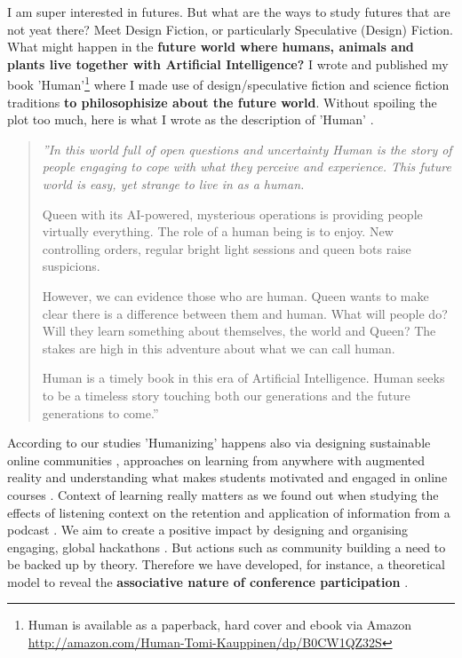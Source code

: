 \documentclass[11pt,letterpaper]{article}
\newenvironment{itquote}
{\begin{quote}\itshape}
{\end{quote}}
\begin{document}
I am super interested in futures. But what are the ways to study futures that are not yeat there? Meet Design Fiction, or particularly Speculative (Design) Fiction. What might happen in the \textbf{future world where humans, animals and plants live together with Artificial Intelligence?} I wrote and published  my book 'Human'\footnote{Human is available as a paperback, hard cover and ebook via Amazon \url{http://amazon.com/Human-Tomi-Kauppinen/dp/B0CW1QZ32S}} where I made use of design/speculative fiction and science fiction traditions \textbf{to philosophisize about the future world}. Without spoiling the plot too much, here is what I wrote as the description of 'Human' \cite{human-I}.
\begin{itquote}
''In this world full of open questions and uncertainty Human is the story of people engaging to cope with what they perceive and experience. This future world is easy, yet strange to live in as a human.

Queen with its AI-powered, mysterious operations is providing people virtually everything. The role of a human being is to enjoy. New controlling orders, regular bright light sessions and queen bots raise suspicions.

However, we can evidence those who are human. Queen wants to make clear there is a difference between them and human. What will people do? Will they learn something about themselves, the world and Queen? The stakes are high in this adventure about what we can call human.

Human is a timely book in this era of Artificial Intelligence. Human seeks to be a timeless story touching both our generations and the future generations to come.''
\end{itquote}

According to our studies 'Humanizing' happens also via designing sustainable online communities \cite{design-community-2024}, approaches on learning from anywhere with augmented reality \cite{CPLJ-AR-2024,learn-anywhere-ar-2024} and understanding what makes students motivated and engaged in online courses \cite{students-engagement-2024}. Context of learning really matters as we found out when studying the effects of listening context on the retention and application of information from a podcast \cite{podcast-retention-2024}. We aim to create a positive impact by designing and organising engaging, global hackathons \cite{hacking-2024}. But actions such as community building a need to be backed up by theory. Therefore we have developed, for instance, a theoretical model to reveal the \textbf{associative nature of conference participation} \cite{associative-nature-2016}.
\end{document}
